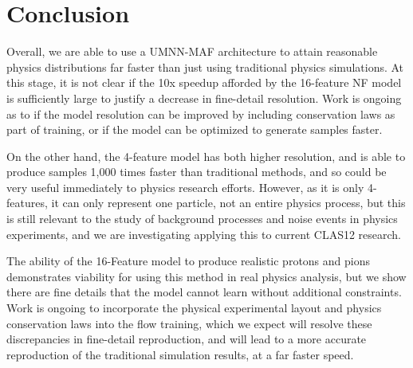 \section{Conclusion}

Overall, we are able to use a UMNN-MAF architecture to attain reasonable physics distributions far faster than just using traditional physics simulations. At this stage, it is not clear if the 10x speedup afforded by the 16-feature NF model is sufficiently large to justify a decrease in fine-detail resolution. Work is ongoing as to if the model resolution can be improved by including conservation laws as part of training, or if the model can be optimized to generate samples faster. 

On the other hand, the 4-feature model has both higher resolution, and is able to produce samples 1,000 times faster than traditional methods, and so could be very useful immediately to physics research efforts. However, as it is only 4-features, it can only represent one particle, not an entire physics process, but this is still relevant to the study of background processes and noise events in physics experiments, and we are investigating applying this to current CLAS12 research.

The ability of the 16-Feature model to produce realistic protons and pions demonstrates viability for using this method in real physics analysis, but we show there are fine details that the model cannot learn without additional constraints. Work is ongoing to incorporate the physical experimental layout and physics conservation laws into the flow training, which we expect will resolve these discrepancies in fine-detail reproduction, and will lead to a more accurate reproduction of the traditional simulation results, at a far faster speed. 





